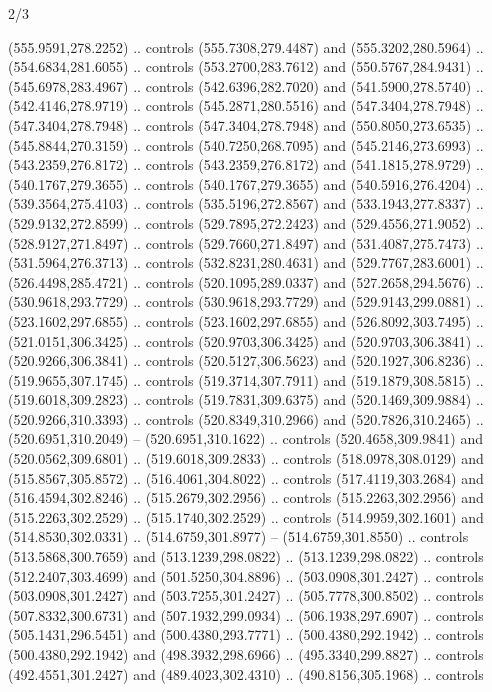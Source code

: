 \begin{flagdescription}{2/3}
\begin{scope}[xshift=0.5\flaglength,yshift=0.5\flagwidth,scale=\flagwidth/525.28]
\begin{scope}[y=0.1mm, x=0.1mm, yscale=-1,shift={(-381.5,-404)}]
  (555.9591,278.2252) .. controls (555.7308,279.4487) and (555.3202,280.5964) ..
  (554.6834,281.6055) .. controls (553.2700,283.7612) and (550.5767,284.9431) ..
  (545.6978,283.4967) .. controls (542.6396,282.7020) and (541.5900,278.5740) ..
  (542.4146,278.9719) .. controls (545.2871,280.5516) and (547.3404,278.7948) ..
  (547.3404,278.7948) .. controls (547.3404,278.7948) and (550.8050,273.6535) ..
  (545.8844,270.3159) .. controls (540.7250,268.7095) and (545.2146,273.6993) ..
  (543.2359,276.8172) .. controls (543.2359,276.8172) and (541.1815,278.9729) ..
  (540.1767,279.3655) .. controls (540.1767,279.3655) and (540.5916,276.4204) ..
  (539.3564,275.4103) .. controls (535.5196,272.8567) and (533.1943,277.8337) ..
  (529.9132,272.8599) .. controls (529.7895,272.2423) and (529.4556,271.9052) ..
  (528.9127,271.8497) .. controls (529.7660,271.8497) and (531.4087,275.7473) ..
  (531.5964,276.3713) .. controls (532.8231,280.4631) and (529.7767,283.6001) ..
  (526.4498,285.4721) .. controls (520.1095,289.0337) and (527.2658,294.5676) ..
  (530.9618,293.7729) .. controls (530.9618,293.7729) and (529.9143,299.0881) ..
  (523.1602,297.6855) .. controls (523.1602,297.6855) and (526.8092,303.7495) ..
  (521.0151,306.3425) .. controls (520.9703,306.3425) and (520.9703,306.3841) ..
  (520.9266,306.3841) .. controls (520.5127,306.5623) and (520.1927,306.8236) ..
  (519.9655,307.1745) .. controls (519.3714,307.7911) and (519.1879,308.5815) ..
  (519.6018,309.2823) .. controls (519.7831,309.6375) and (520.1469,309.9884) ..
  (520.9266,310.3393) .. controls (520.8349,310.2966) and (520.7826,310.2465) ..
  (520.6951,310.2049) -- (520.6951,310.1622) .. controls (520.4658,309.9841) and
  (520.0562,309.6801) .. (519.6018,309.2833) .. controls (518.0978,308.0129) and
  (515.8567,305.8572) .. (516.4061,304.8022) .. controls (517.4119,303.2684) and
  (516.4594,302.8246) .. (515.2679,302.2956) .. controls (515.2263,302.2956) and
  (515.2263,302.2529) .. (515.1740,302.2529) .. controls (514.9959,302.1601) and
  (514.8530,302.0331) .. (514.6759,301.8977) -- (514.6759,301.8550) .. controls
  (513.5868,300.7659) and (513.1239,298.0822) .. (513.1239,298.0822) .. controls
  (512.2407,303.4699) and (501.5250,304.8896) .. (503.0908,301.2427) .. controls
  (503.0908,301.2427) and (503.7255,301.2427) .. (505.7778,300.8502) .. controls
  (507.8332,300.6731) and (507.1932,299.0934) .. (506.1938,297.6907) .. controls
  (505.1431,296.5451) and (500.4380,293.7771) .. (500.4380,292.1942) .. controls
  (500.4380,292.1942) and (498.3932,298.6966) .. (495.3340,299.8827) .. controls
  (492.4551,301.2427) and (489.4023,302.4310) .. (490.8156,305.1968) .. controls

\end{scope}
\end{scope}
\end{flagdescription}
